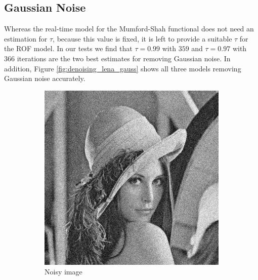 \documentclass[abstracton]{scrreprt}
\begin{document}
        \subsection{Gaussian Noise} %
        \label{sub:gaussian_noise}
            Whereas the real-time model for the Mumford-Shah functional does not need an estimation for $\tau$, because this value is fixed, it is left to provide a suitable $\tau$ for the ROF model. In our tests we find that $\tau = 0.99$ with $359$ and $\tau = 0.97$ with $366$ iterations are the two best estimates for removing Gaussian noise. In addition, Figure \ref{fig:denoising_lena_gauss} shows all three models removing Gaussian noise accurately.\\
            \begin{figure}[!ht]
                \centering
                \begin{subfigure}[b]{0.244\textwidth}
                    \includegraphics[width=\textwidth]{img/images/lena_gauss_noise.png}
                    \caption{Noisy image}
                \end{subfigure}
                \begin{subfigure}[b]{0.244\textwidth}

\end{subfigure}
\end{figure}
\end{document}

